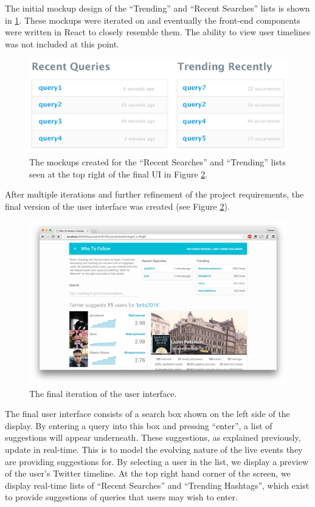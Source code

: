 \documentclass{l4proj}
\begin{document}
        The initial mockup design of the ``Trending'' and ``Recent Searches'' lists is shown in \ref{listmockups}. These mockups were iterated on and eventually the front-end components were written in React to closely resemble them. The ability to view user timelines was not included at this point.
        
\begin{figure}[H]
\centering
\includegraphics[scale=0.5]{listmockups.pdf}
\caption{The mockups created for the ``Recent Searches'' and ``Trending'' lists seen at the top right of the final UI in Figure \ref{finalscreenshot}.}
\label{listmockups}
\end{figure}    

After multiple iterations and further refinement of the project requirements, the final version of the user interface was created (see Figure \ref{finalscreenshot}).
        
\begin{figure}[H]
\centering
\includegraphics[scale=0.17]{finalscreenshot.png}
\caption{The final iteration of the user interface.}
\label{finalscreenshot}
\end{figure}

The final user interface consists of a search box shown on the left side of the display. By entering a query into this box and pressing ``enter'', a list of suggestions will appear underneath. These suggestions, as explained previously, update in real-time. This is to model the evolving nature of the live events they are providing suggestions for. By selecting a user in the list, we display a preview of the user's Twitter timeline. At the top right hand corner of the screen, we display real-time lists of ``Recent Searches'' and ``Trending Hashtags'', which exist to provide suggestions of queries that users may wish to enter.
\end{document}
